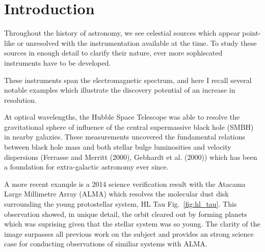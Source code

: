 \chapter{Introduction}


Throughout the history of astronomy, we see celestial sources which appear point-like or unresolved with the instrumentation available at the time. To study these sources in enough detail to clarify their nature, ever more sophiscated instruments have to be developed. 

These instruments span the electromagnetic spectrum, and here I recall several notable examples which illustrate the discovery potential of an increase in resolution.

At optical wavelengths, the Hubble Space Telescope was able to resolve the gravitational sphere of influence of the central supermassive black hole (SMBH) in nearby galaxies. These measurements uncovered the fundamental relations between black hole mass and both stellar bulge luminosities and velocity dispersions (Ferrasse and Merritt (2000), Gebhardt et al. (2000)) which has been a foundation for extra-galactic astronomy ever since. 

A more recent example is a 2014 science verification result with the Atacama Large Millimetre Array (ALMA) \cite{brogan_2015} which resolves the molecular dust disk surrounding the young protostellar system, HL Tau Fig.~\ref{fig:hl_tau}. This observation showed, in unique detail, the orbit cleared out by forming planets which was suprising given that the stellar system was so young. The clarity of the image surpasses all previous work on the subject and provides an strong science case for conducting observations of similiar systems with ALMA. 


